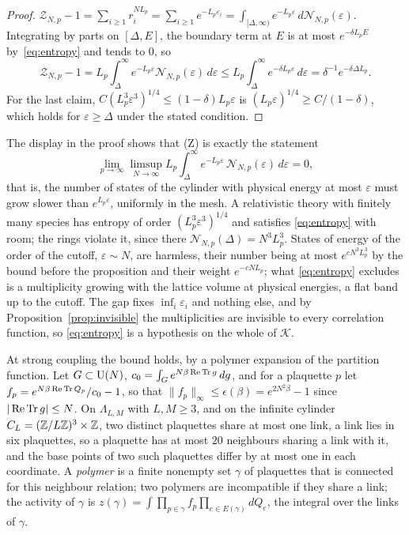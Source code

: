 \begin{proof}
$\mathcal Z_{N,p}-1=\sum_{i\ge1}r_i^{NL_p}=\sum_{i\ge1}e^{-L_p\varepsilon_i}=
\int_{[\Delta,\infty)}e^{-L_p\varepsilon}\,d\mathcal N_{N,p}(\varepsilon)$.
Integrating by parts on $[\Delta,E]$, the boundary term at $E$ is at most
$e^{-\delta L_pE}$ by~\eqref{eq:entropy} and tends to $0$, so
\[
\mathcal Z_{N,p}-1=L_p\int_\Delta^\infty e^{-L_p\varepsilon}\mathcal N_{N,p}
(\varepsilon)\,d\varepsilon\le L_p\int_\Delta^\infty e^{-\delta L_p
\varepsilon}\,d\varepsilon=\delta^{-1}e^{-\delta\Delta L_p}.
\]
For the last claim, $C(L_p^3\varepsilon^3)^{1/4}\le(1-\delta)L_p\varepsilon$
is $(L_p\varepsilon)^{1/4}\ge C/(1-\delta)$, which holds for $\varepsilon\ge
\Delta$ under the stated condition.
\end{proof}

The display in the proof shows that (Z) is exactly the statement
\[
\lim_{p\to\infty}\limsup_{N\to\infty}L_p\int_\Delta^\infty e^{-L_p\varepsilon}
\,\mathcal N_{N,p}(\varepsilon)\,d\varepsilon=0 ,
\]
that is, the number of states of the cylinder with
physical energy at most $\varepsilon$ must grow slower than $e^{L_p
\varepsilon}$, uniformly in the mesh. A relativistic theory with finitely
many species has entropy of order $(L_p^3\varepsilon^3)^{1/4}$ and satisfies
\eqref{eq:entropy} with room; the rings violate it, since there $\mathcal
N_{N,p}(\Delta)=N^3L_p^3$. States of energy of the order of the cutoff,
$\varepsilon\sim N$, are harmless, their number being at most
$e^{cN^3L_p^3}$ by the bound before the proposition and their weight
$e^{-cNL_p}$; what \eqref{eq:entropy} excludes is a multiplicity growing with
the lattice volume at physical energies, a flat band up to the cutoff. The
gap fixes $\inf_i\varepsilon_i$ and nothing else, and by
Proposition~\ref{prop:invisible} the multiplicities are invisible to every
correlation function, so \eqref{eq:entropy} is a hypothesis on the whole of
$\mathcal K$.

At strong coupling the bound holds, by a polymer expansion of the partition
function. Let $G\subset\mathrm{U}(N)$, $c_0=\int_Ge^{N\beta\operatorname{Re}\operatorname{Tr} g}\,dg$, and for a
plaquette $p$ let $f_p=e^{N\beta\operatorname{Re}\operatorname{Tr} Q_p}/c_0-1$, so that $\|f_p\|_\infty
\le\epsilon(\beta)=e^{2N^2\beta}-1$ since $|\operatorname{Re}\operatorname{Tr} g|\le N$. On $\Lambda_{L,M}$
with $L,M\ge3$, and on the infinite cylinder $C_L=(\mathbb{Z}/L\mathbb{Z})^3\times\mathbb{Z}$, two
distinct plaquettes share at most one link, a link lies in six plaquettes,
so a plaquette has at most $20$ neighbours sharing a link with it, and the
base points of two such plaquettes differ by at most one in each
coordinate. A \emph{polymer} is a finite nonempty set $\gamma$ of plaquettes
that is connected for this neighbour relation; two polymers are
incompatible if they share a link; the activity of $\gamma$ is
$z(\gamma)=\int\prod_{p\in\gamma}f_p\prod_{e\in E(\gamma)}dQ_e$, the integral
over the links of $\gamma$.

